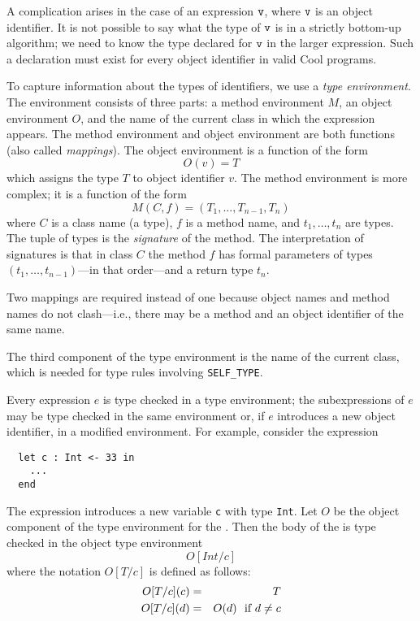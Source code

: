 A complication arises in the case of an expression $\tt v$, where $\tt
v$ is an object identifier.  It is not possible to say what the type of $\tt
v$ is in a strictly bottom-up algorithm; we need to know the type
declared for $\tt v$ in the larger expression.  Such a declaration
must exist for every object identifier in valid Cool programs.

To capture information about the types of identifiers, we use a
{\em type environment}.  The environment consists of three parts:
a method environment $M$, an object environment $O$, and 
the name of the current class in which the expression appears.  
The method environment and object environment are both functions (also
called {\em mappings}).  The object environment is a function of the
form
\[  O(v) = T \]
which assigns the type $ T$ to object identifier $ v$.
The method environment is more complex; it is a function of the form
\[  M(C,f) = (T_1,\ldots,T_{n-1},T_n) \]
where $ C$ is a class name (a type), $f$ is a method name,
and $ t_1,\ldots,t_n$ are types.  The tuple of types is
the {\em signature} of the method.  The interpretation of signatures is
that in class $ C$ the method $ f$ has formal parameters of
types $ (t_1,\ldots,t_{n-1})$---in that order---and a return type $t_n$.


Two mappings are required instead of one because object names and method
names do not clash---i.e., there may be a method and an object identifier
of the same name.

The third component of the type environment is the name of the current
class, which is needed for type rules involving {\tt SELF\_TYPE}.

Every expression $e$ is type checked in a type environment;
the subexpressions of $e$ may be type checked in the same environment or,
if $e$ introduces a new object identifier, in a modified environment.
For example, consider the expression
\begin{center}
\protect\begin{verbatim}
  let c : Int <- 33 in
    ...
  end
\end{verbatim}
\end{center}
The  expression introduces a new variable {\tt c} with type {\tt Int}.
Let $O$ be the object component of the type environment for the .
Then the body of the  is type checked in the object type environment
\[ O[Int/c] \]
where the notation $O[T/c]$ is defined as follows:
\begin{eqnarray*}
O[T/c](c) & = & T \\
O[T/c](d) & = & O(d)\ \ \mbox{\rm if\ } d \neq c
\end{eqnarray*}

